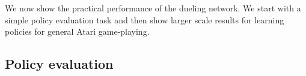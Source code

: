 
We now show the practical performance of the dueling network.
We start with a simple policy evaluation task and then show larger scale results
for learning policies for general Atari game-playing.


\subsection{Policy evaluation}

